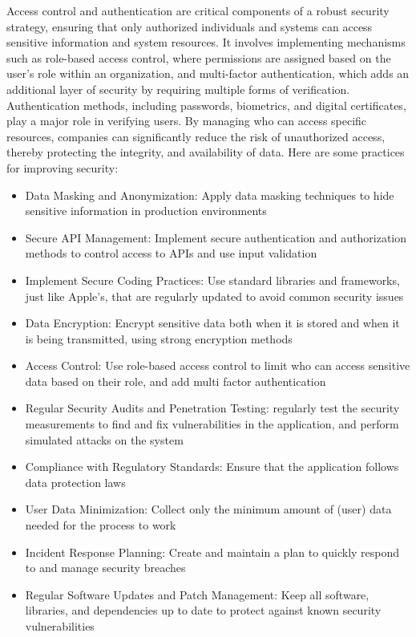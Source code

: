 \newline \noindent Access control and authentication are critical components of a robust security strategy, ensuring that only authorized individuals and systems can access sensitive information and system resources. It involves implementing mechanisms such as role-based access control, where permissions are assigned based on the user's role within an organization, and multi-factor authentication, which adds an additional layer of security by requiring multiple forms of verification. Authentication methods, including passwords, biometrics, and digital certificates, play a major role in verifying users. By managing who can access specific resources, companies can significantly reduce the risk of unauthorized access, thereby protecting the integrity, and availability of data.
\newline \noindent Here are some practices for improving security:  

\begin{itemize}
    \item Data Masking and Anonymization: Apply data masking techniques to hide sensitive information in production environments

    \item Secure API Management: Implement secure authentication and authorization methods to control access to APIs and use input validation

    \item Implement Secure Coding Practices: Use standard libraries and frameworks, just like Apple's, that are regularly updated to avoid common security issues

    \item Data Encryption: Encrypt sensitive data both when it is stored and when it is being transmitted, using strong encryption methods

    \item Access Control: Use role-based access control to limit who can access sensitive data based on their role, and add multi factor authentication

    \item Regular Security Audits and Penetration Testing: regularly test the security measurements to find and fix vulnerabilities in the application, and perform simulated attacks on the system

    \item Compliance with Regulatory Standards: Ensure that the application follows data protection laws

    \item User Data Minimization: Collect only the minimum amount of (user) data needed for the process to work

    \item Incident Response Planning: Create and maintain a plan to quickly respond to and manage security breaches

    \item Regular Software Updates and Patch Management: Keep all software, libraries, and dependencies up to date to protect against known security vulnerabilities
\end{itemize}


